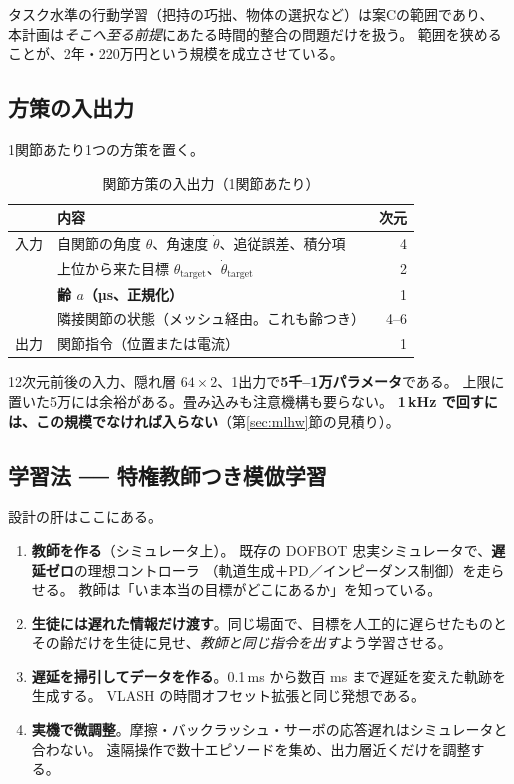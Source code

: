 \documentclass[11pt,a4paper]{article}
\newcommand{\prob}[1]{\textbf{\textcolor{red!55!black}{#1}}}
\newcommand{\keyp}[1]{\textbf{\textcolor{blue!45!black}{#1}}}
\begin{document}
\noindent
タスク水準の行動学習（把持の巧拙、物体の選択など）は案Cの範囲であり、
本計画は\emph{そこへ至る前提}にあたる時間的整合の問題だけを扱う。
範囲を狭めることが、2年・220万円という規模を成立させている。

\subsection{方策の入出力}

1関節あたり1つの方策を置く。

\begin{table}[htbp]
\centering
\small
\caption{関節方策の入出力（1関節あたり）}
\begin{tabularx}{\textwidth}{@{}l X r@{}}
\toprule
 & \textbf{内容} & \textbf{次元} \\
\midrule
入力 & 自関節の角度 $\theta$、角速度 $\dot\theta$、追従誤差、積分項 & 4 \\
     & 上位から来た目標 $\theta_{\mathrm{target}}$、$\dot\theta_{\mathrm{target}}$ & 2 \\
     & \keyp{齢 $a$（µs、正規化）} & 1 \\
     & 隣接関節の状態（メッシュ経由。これも齢つき） & 4--6 \\
\midrule
出力 & 関節指令（位置または電流） & 1 \\
\bottomrule
\end{tabularx}
\end{table}

\noindent
12次元前後の入力、隠れ層 $64\times2$、1出力で\keyp{5千--1万パラメータ}である。
上限に置いた5万には余裕がある。畳み込みも注意機構も要らない。
\prob{1\,kHz で回すには、この規模でなければ入らない}（第\ref{sec:mlhw}節の見積り）。

\subsection{学習法 ── 特権教師つき模倣学習}

設計の肝はここにある。

\begin{enumerate}[leftmargin=1.6em,itemsep=3pt]
  \item \keyp{教師を作る}（シミュレータ上）。
        既存の DOFBOT 忠実シミュレータで、\keyp{遅延ゼロ}の理想コントローラ
        （軌道生成＋PD／インピーダンス制御）を走らせる。
        教師は「いま本当の目標がどこにあるか」を知っている。
  \item \keyp{生徒には遅れた情報だけ渡す}。同じ場面で、目標を人工的に遅らせたものと
        その齢だけを生徒に見せ、\emph{教師と同じ指令を出す}よう学習させる。
  \item \keyp{遅延を掃引してデータを作る}。0.1\,ms から数百 ms まで遅延を変えた軌跡を生成する。
        VLASH の時間オフセット拡張と同じ発想である。
  \item \keyp{実機で微調整}。摩擦・バックラッシュ・サーボの応答遅れはシミュレータと合わない。
        遠隔操作で数十エピソードを集め、出力層近くだけを調整する。
\end{enumerate}
\end{document}
